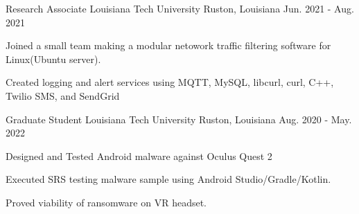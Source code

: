 \begin{cventries}
  \cventry
    {Research Associate} %
    {Louisiana Tech University} %
    {Ruston, Louisiana} %
    {Jun. 2021 - Aug. 2021} %
    {
      \begin{cvitems} %
        \item {Joined a small team making a modular netowork traffic filtering software for Linux(Ubuntu server).}
	      \item {Created logging and alert services using MQTT, MySQL, libcurl, curl, C++, Twilio SMS, and SendGrid}
      \end{cvitems}
    }


  \cventry
    {Graduate Student} %
    {Louisiana Tech University} %
    {Ruston, Louisiana} %
    {Aug. 2020 - May. 2022} %
    {
      \begin{cvitems} %
        \item {Designed and Tested Android malware against Oculus Quest 2}
	      \item {Executed SRS testing malware sample using Android Studio/Gradle/Kotlin.}
        \item {Proved viability of ransomware on VR headset.}
      \end{cvitems}
    }


\end{cventries}
